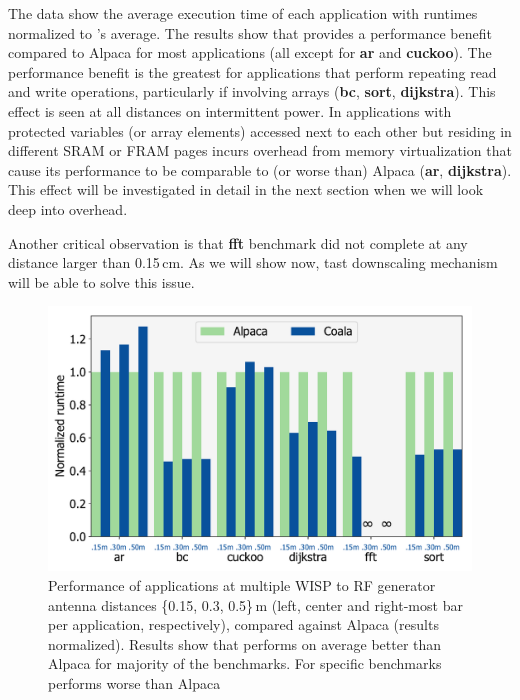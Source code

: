 The data show the average execution time of each application with runtimes normalized to \sys's average.  The results show that \sys provides a performance benefit compared to Alpaca for most applications (all except for \textbf{ar} and \textbf{cuckoo}). The performance benefit is the greatest for applications that perform repeating read and write operations, particularly if involving arrays (\textbf{bc}, \textbf{sort}, \textbf{dijkstra}). This effect is seen at all distances on intermittent power. In applications with protected variables (or array elements) accessed next to each other but residing in different SRAM or FRAM pages \sys incurs overhead from memory virtualization that cause its performance to be comparable to (or worse than) Alpaca (\textbf{ar}, \textbf{dijkstra}). This effect will be investigated in detail in the next section when we will look deep into \sys overhead. 

Another critical observation is that \textbf{fft} benchmark did not complete at any distance larger than 0.15\,cm. As we will show now, \sys tast downscaling mechanism will be able to solve this issue.  

\begin{figure}
	\centering
	\includegraphics[width=\columnwidth]{figures/coala_alpaca_gcc}
	\caption{Performance of \sys applications at multiple WISP to RF generator antenna distances \{0.15, 0.3, 0.5\}\,m (left, center and right-most bar per application, respectively), compared against Alpaca (results normalized). Results show that \sys performs on average better than Alpaca for majority of the benchmarks. For specific benchmarks \sys performs worse than Alpaca  }
	\label{fig:runtime}
\end{figure}


